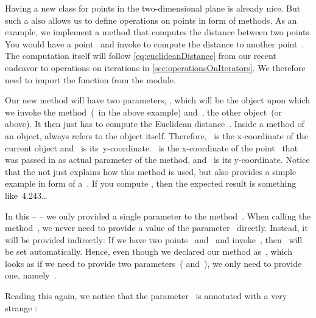 Having a new class for points in the two-dimensional plane is already nice.
But such a  also allows us to define operations on points in form of methods.
As an example, we implement a method  that computes the distance between two points.
You would have a point~ and invoke  to compute the distance to another point~.
The computation itself will follow \cref{eq:euclideanDistance} from our recent endeavor to operations on iterations in \cref{sec:operationsOnIterators}.
We therefore need to import the  function from the  module.

Our new method  will have two parameters, , which will be the object upon which we invoke the method~(~in the above example) and~, the other object~(or  above).
It then just has to compute the Euclidean distance~.
Inside a method of an object,  always refers to the object itself.
Therefore, ~is the x\nobreakdashes-coordinate of the current object and ~is its~y\nobreakdashes-coordinate.
~is the x\nobreakdashes-coordinate of the point~ that was passed in as actual parameter of the method, and ~is its y\nobreakdashes-coordinate.
Notice that the  not just explains how this method is used, but also provides a simple example in form of a~.
If you compute , then the expected result is something like~4.243{\dots}%
%
\begin{sloppypar}%
In this  --  -- we only provided a single parameter to the method~.
When calling the method~, we never need to provide a value of the parameter~ directly.
Instead, it will be provided indirectly:
If we have two points~ and~ and invoke~, then~ will be set automatically.
Hence, even though we declared our method as~, which looks as if we need to provide two parameters~( and~), we only need to provide one, namely~.%
\end{sloppypar}%
%
Reading this again, we notice that the parameter~ is annotated with a very strange :
